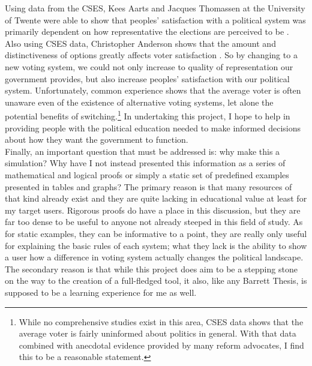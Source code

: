 \documentclass[12pt]{article}
\newcounter{step}
\begin{document}
\qquad Using data from the CSES, Kees Aarts and Jacques Thomassen at the University of Twente were able to show that peoples' satisfaction with a political system was primarily dependent on how representative the elections are perceived to be \parencite{aarts}. Also using CSES data, Christopher Anderson shows that the amount and distinctiveness of options greatly affects voter satisfaction \parencite{anderson}. So by changing to a new voting system, we could not only increase to quality of representation our government provides, but also increase peoples' satisfaction with our political system. Unfortunately, common experience shows that the average voter is often unaware even of the existence of alternative voting systems, let alone the potential benefits of switching.\footnote{While no comprehensive studies exist in this area, CSES data shows that the average voter is fairly uninformed about politics in general. With that data combined with anecdotal evidence provided by many reform advocates, I find this to be a reasonable statement.} In undertaking this project, I hope to help in providing people with the political education needed to make informed decisions about how they want the government to function. \\

\qquad Finally, an important question that must be addressed is: why make this a simulation? Why have I not instead presented this information as a series of mathematical and logical proofs or simply a static set of predefined examples presented in tables and graphs? The primary reason is that many resources of that kind already exist and they are quite lacking in educational value at least for my target users. Rigorous proofs do have a place in this discussion, but they are far too dense to be useful to anyone not already steeped in this field of study. As for static examples, they can be informative to a point, they are really only useful for explaining the basic rules of each system; what they lack is the ability to show a user how a difference in voting system actually changes the political landscape. The secondary reason is that while this project does aim to be a stepping stone on the way to the creation of a full-fledged tool, it also, like any Barrett Thesis, is supposed to be a learning experience for me as well. \\

\end{document}
